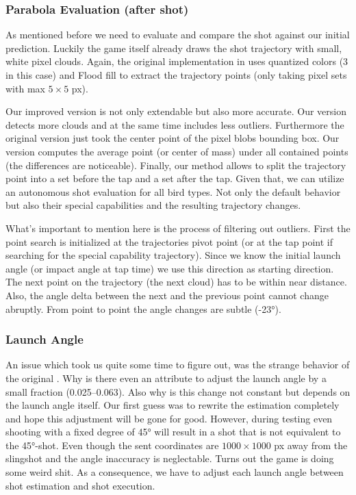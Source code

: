 \subsubsection{Parabola Evaluation (after shot)}

As mentioned before we need to evaluate and compare the shot against our initial prediction. Luckily the game itself already draws the shot trajectory with small, white pixel clouds. Again, the original implementation in  uses quantized colors (\num{3} in this case) and Flood fill to extract the trajectory points (only taking pixel sets with max $5\times5$ px).

Our improved version  is not only extendable but also more accurate. Our version detects more clouds and at the same time includes less outliers. Furthermore the original version just took the center point of the pixel blobs bounding box. Our version computes the average point (or center of mass) under all contained points (the differences are noticeable). Finally, our method allows to split the trajectory point into a set before the tap and a set after the tap. Given that, we can utilize an autonomous shot evaluation for all bird types. Not only the default behavior but also their special capabilities and the resulting trajectory changes.

What's important to mention here is the process of filtering out outliers. First the point search is initialized at the trajectories pivot point (or at the tap point if searching for the special capability trajectory). Since we know the initial launch angle (or impact angle at tap time) we use this direction as starting direction. The next point on the trajectory (the next cloud) has to be within near distance. Also, the angle delta between the next and the previous point cannot change abruptly. From point to point the angle changes are subtle (\ang{+-23}).


\subsubsection{Launch Angle}\label{ch:shot:launchAngle}

An issue which took us quite some time to figure out, was the strange behavior of the original . Why is there even an attribute to adjust the launch angle by a small fraction (\numrange{0.025}{0.063}). Also why is this change not constant but depends on the launch angle itself. Our first guess was to rewrite the estimation completely and hope this adjustment will be gone for good. 
However, during testing even shooting with a fixed degree of \ang{45} will result in a shot that is not equivalent to the \ang{45}-shot. Even though the sent coordinates are $1000\times1000$ \si{px} away from the slingshot and the angle inaccuracy is neglectable. Turns out the game is doing some weird shit. As a consequence, we have to adjust each launch angle between shot estimation and shot execution. %

